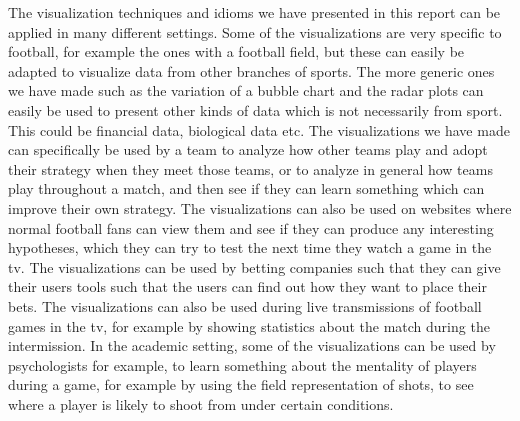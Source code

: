 \documentclass[Report.tex]{subfiles}
\begin{document}
The visualization techniques and idioms we have presented in this report can be applied in many different settings. Some of the visualizations
are very specific to football, for example the ones with a football field, but these can easily be adapted to visualize data from other branches
of sports. The more generic ones we have made such as the variation of a bubble chart and the radar plots can easily be used to present other
kinds of data which is not necessarily from sport. This could be financial data, biological data etc.
The visualizations we have made can specifically be used by a team to analyze how other teams play
and adopt their strategy when they meet those teams, or to analyze in general how teams play throughout a match, and then see if they can learn
something which can improve their own strategy. The visualizations can also be used on websites where normal football fans can view them and see if they can produce any interesting hypotheses, which they can try to test the next time they watch a game in the tv. The visualizations can be used by betting companies such that they can give their users tools such that the users can find out how they want to place their bets. The visualizations can also be used during live transmissions of football games in the tv, for example by showing statistics about the match during the intermission. In the academic setting, some of the visualizations can be used by psychologists for example, to learn something about the mentality of players during a game, for example by using the field representation of shots, to see where a player is likely to shoot from under certain conditions.
\end{document}
